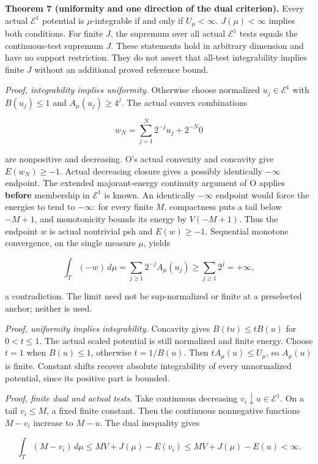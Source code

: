 \documentclass[
  11pt,
]{article}
\begin{document}
\textbf{Theorem 7 (uniformity and one direction of the dual criterion).}
Every actual \(\mathcal E^1\) potential is \(\mu\)-integrable if and
only if \(U_\mu<\infty\). \(J(\mu)<\infty\) implies both conditions. For
finite \(J\), the supremum over all actual \(\mathcal E^1\) tests equals
the continuous-test supremum \(J\). These statements hold in arbitrary
dimension and have no support restriction. They do not assert that
all-test integrability implies finite \(J\) without an additional proved
reference bound.

\emph{Proof, integrability implies uniformity.} Otherwise choose
normalized \(u_j\in\mathcal E^1\) with \(B(u_j)\leq1\) and
\(A_\mu(u_j)\geq4^j\). The actual convex combinations

\[
w_N=\sum_{j=1}^N2^{-j}u_j+2^{-N}0
\]

are nonpositive and decreasing. O's actual convexity and concavity give
\(E(w_N)\geq-1\). Actual decreasing closure gives a possibly identically
\(-\infty\) endpoint. The extended majorant-energy continuity argument
of O applies \textbf{before} membership in \(\mathcal E^1\) is known. An
identically \(-\infty\) endpoint would force the energies to tend to
\(-\infty\): for every finite \(M\), compactness puts a tail below
\(-M+1\), and monotonicity bounds its energy by \(V(-M+1)\). Thus the
endpoint \(w\) is actual nontrivial psh and \(E(w)\geq-1\). Sequential
monotone convergence, on the single measure \(\mu\), yields

\[
\int_T(-w)\,d\mu=\sum_{j\geq1}2^{-j}A_\mu(u_j)
 \geq\sum_{j\geq1}2^j=+\infty,
\]

a contradiction. The limit need not be sup-normalized or finite at a
preselected anchor; neither is used.

\emph{Proof, uniformity implies integrability.} Concavity gives
\(B(tu)\leq tB(u)\) for \(0<t\leq1\). The actual scaled potential is
still normalized and finite energy. Choose \(t=1\) when \(B(u)\leq1\),
otherwise \(t=1/B(u)\). Then \(tA_\mu(u)\leq U_\mu\), so \(A_\mu(u)\) is
finite. Constant shifts recover absolute integrability of every
unnormalized potential, since its positive part is bounded.

\emph{Proof, finite dual and actual tests.} Take continuous decreasing
\(v_i\downarrow u\in\mathcal E^1\). On a tail \(v_i\leq M\), a fixed
finite constant. Then the continuous nonnegative functions \(M-v_i\)
increase to \(M-u\). The dual inequality gives

\[
\int_T(M-v_i)\,d\mu\leq MV+J(\mu)-E(v_i)
 \leq MV+J(\mu)-E(u)<\infty.
\]
\end{document}
